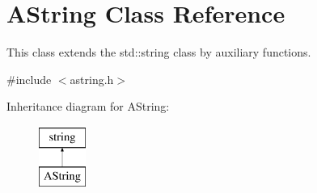 \hypertarget{class_a_string}{}\section{A\+String Class Reference}
\label{class_a_string}


This class extends the std\+::string class by auxiliary functions.  




{\ttfamily \#include $<$astring.\+h$>$}

Inheritance diagram for A\+String\+:\begin{figure}[H]
\begin{center}
\leavevmode
\includegraphics[height=2.000000cm]{class_a_string}
\end{center}
\end{figure}
